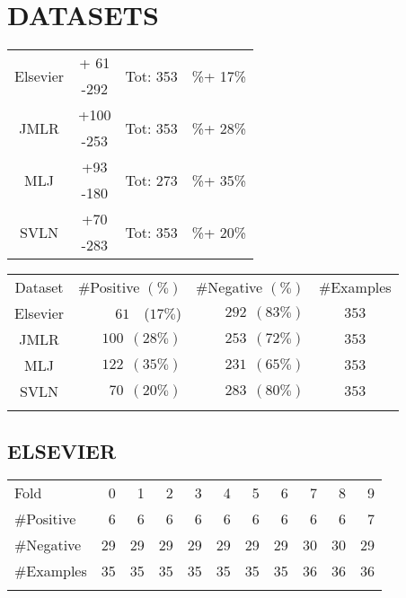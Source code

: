 \section{DATASETS}
\begin{table}[htbp]
	\centering
	\begin{tabular}{c | c | c | c}
		\multirow{2}{*}{Elsevier} & + 61 & \multirow{2}{*}{Tot: 353}& \multirow{2}{*}{\%+ 17\%} \\
		 & -292 &  & \\
		 \multirow{2}{*}{JMLR} & +100 & \multirow{2}{*}{Tot: 353} & \multirow{2}{*}{\%+ 28\%} \\
		 & -253 & & \\
 		 \multirow{2}{*}{MLJ} & +93 & \multirow{2}{*}{Tot: 273} & \multirow{2}{*}{\%+ 35\%} \\
 		 & -180 & & \\
 		 \multirow{2}{*}{SVLN} & +70 & \multirow{2}{*}{Tot: 353} & \multirow{2}{*}{\%+ 20\%} \\
 		 & -283 & & \\
		\end{tabular}%
	\label{tab:}
\end{table}

\begin{table}[htbp]
	\label{tab:datasets}
	\centering
	\begin{tabular}{c@{\qquad}r@{\qquad}r@{\qquad}c}
\toprule
\addlinespace
Dataset & \#Positive $(\%)$ & \#Negative $(\%)$ & \#Examples \\
\addlinespace
\midrule
\addlinespace
Elsevier & $61$~~($17\%$) & $292~~(83\%)$ & $353$ \\
JMLR     & $100~~(28\%)$ & $253~~(72\%)$ & $353$ \\
MLJ      & $122~~(35\%)$ & $231~~(65\%)$ & $353$ \\
SVLN     & $70~~(20\%)$ & $283~~(80\%)$ & $353$ \\
\addlinespace
\bottomrule
	\end{tabular}
\end{table}



\subsection{ELSEVIER}
\begin{table}[htbp]
	\centering
		\begin{tabular}{l@{\qquad}*{10}{r}}
		\toprule
\addlinespace
			Fold &  0 &  1 &  2 &  3 &  4 &  5 &  6 &  7 &  8 &  9 \\
\addlinespace
\midrule
\addlinespace
\#Positive  & 6  & 6  &  6 &  6 &  6 &  6 &  6 &  6 &  6 &  7 \\
\#Negative  & 29 & 29 & 29 & 29 & 29 & 29 & 29 & 30 & 30 & 29 \\
\#Examples & 35 & 35 & 35 & 35 & 35 & 35 & 35 & 36 & 36 & 36 \\
\addlinespace
\bottomrule
		\end{tabular}
	\label{tab:Elsevier}
\end{table}
